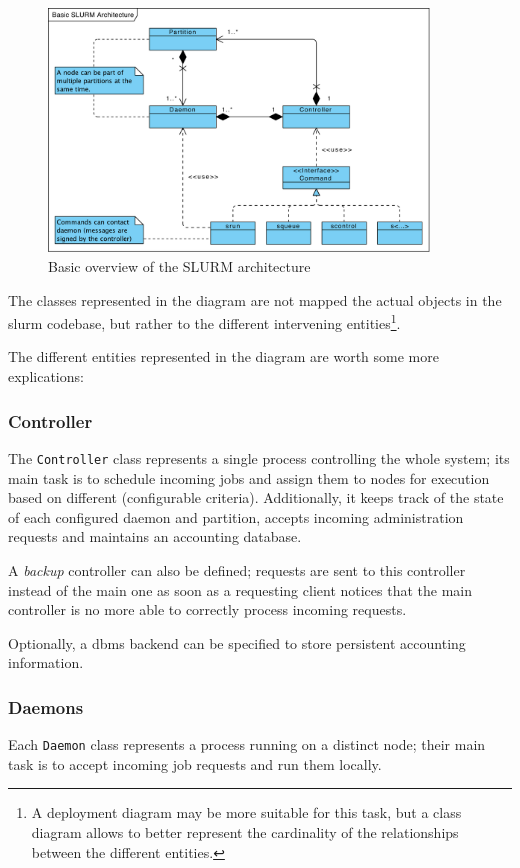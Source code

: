 \begin{figure}[ht]
	\centering
	\includegraphics[width=0.9\textwidth]{figures/basic-slurm-arch}
	\caption{Basic overview of the SLURM architecture}
	\label{fig:slurm-arch}
\end{figure}

The classes represented in the diagram are not mapped the actual objects in the \gls{slurm} codebase, but rather to the different intervening entities\footnote{A deployment diagram may be more suitable for this task, but a class diagram allows to better represent the cardinality of the relationships between the different entities.}.

The different entities represented in the diagram are worth some more explications:

\subsubsection{Controller}
The \texttt{Controller} class represents a single process controlling the whole system; its main task is to schedule incoming jobs and assign them to nodes for execution based on different (configurable criteria). Additionally, it keeps track of the state of each configured daemon and partition, accepts incoming administration requests and maintains an accounting database.

A \emph{backup} controller can also be defined; requests are sent to this controller instead of the main one as soon as a requesting client notices that the main controller is no more able to correctly process incoming requests.

Optionally, a \gls{dbms} backend can be specified to store persistent accounting information.

\subsubsection{Daemons}
Each \texttt{Daemon} class represents a process running on a distinct node; their main task is to accept incoming job requests and run them locally.

